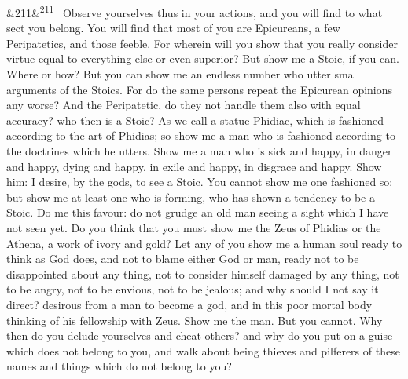\documentclass[12pt]{article}
\newcommand{\para}[1][]{\par\noindent\ifx&#1&\else\textsuperscript{\footnotesize #1}~\fi}
\begin{document}
\para[211] Observe yourselves thus in your actions, and you will find to what sect you belong. You will find that most of you are Epicureans, a few Peripatetics, and those feeble. For wherein will you show that you really consider virtue equal to everything else or even superior? But show me a Stoic, if you can. Where or how? But you can show me an endless number who utter small arguments of the Stoics. For do the same persons repeat the Epicurean opinions any worse? And the Peripatetic, do they not handle them also with equal accuracy? who then is a Stoic? As we call a statue Phidiac, which is fashioned according to the art of Phidias; so show me a man who is fashioned according to the doctrines which he utters. Show me a man who is sick and happy, in danger and happy, dying and happy, in exile and happy, in disgrace and happy. Show him: I desire, by the gods, to see a Stoic. You cannot show me one fashioned so; but show me at least one who is forming, who has shown a tendency to be a Stoic. Do me this favour: do not grudge an old man seeing a sight which I have not seen yet. Do you think that you must show me the Zeus of Phidias or the Athena, a work of ivory and gold? Let any of you show me a human soul ready to think as God does, and not to blame either God or man, ready not to be disappointed about any thing, not to consider himself damaged by any thing, not to be angry, not to be envious, not to be jealous; and why should I not say it direct? desirous from a man to become a god, and in this poor mortal body thinking of his fellowship with Zeus. Show me the man. But you cannot. Why then do you delude yourselves and cheat others? and why do you put on a guise which does not belong to you, and walk about being thieves and pilferers of these names and things which do not belong to you?
\end{document}
